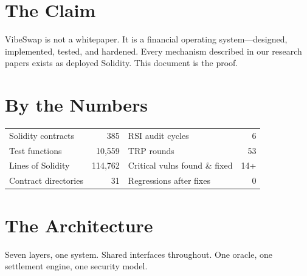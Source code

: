 \documentclass[10pt, letterpaper]{article}
\begin{document}

\section{The Claim}

VibeSwap is not a whitepaper. It is a financial operating system---designed, implemented, tested, and hardened. Every mechanism described in our research papers exists as deployed Solidity. This document is the proof.


\section{By the Numbers}

\vspace{-0.2em}
\begin{center}
\small
\begin{tabular}{@{} l r @{\qquad} l r @{}}
\toprule
Solidity contracts & 385 & RSI audit cycles & 6 \\
Test functions & 10{,}559 & TRP rounds & 53 \\
Lines of Solidity & 114{,}762 & Critical vulns found \& fixed & 14+ \\
Contract directories & 31 & Regressions after fixes & 0 \\
\bottomrule
\end{tabular}
\end{center}


\section{The Architecture}

Seven layers, one system. Shared interfaces throughout. One oracle, one settlement engine, one security model.
\end{document}
